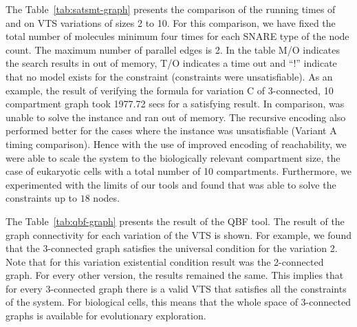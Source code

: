 

%
The Table~\ref{tab:satsmt-graph} presents the comparison of the running times of {\smttool} and {\sattool} on VTS variations of sizes 2 to 10.
%
For this comparison, we have fixed the total number of molecules minimum four times for each SNARE type of the node count. 
%
The maximum number of parallel edges is 2.
%
%
%
In the table M/O indicates the search results in out of memory, T/O indicates a time out and ``!'' indicate that no model exists for the constraint  (constraints were unsatisfiable).
%
As an example, the result of verifying the formula for variation C of 3-connected, 10 compartment graph took 1977.72 secs for a satisfying result.
%
In comparison, {\sattool} was unable to solve the instance and ran out of memory.
%
The recursive encoding also performed better for the cases where the instance was unsatisfiable (Variant A timing comparison).
%
Hence with the use of improved encoding of reachability, we were able to scale the system to the biologically relevant compartment size, the case of eukaryotic cells with a total number of 10 compartments.
%
Furthermore, we experimented with the limits of our tools and found that {\smttool} was able to solve the constraints up to $18$ nodes.



The Table~\ref{tab:qbf-graph} presents the result of the QBF tool.
%
The result of the graph connectivity for each variation of the VTS is shown.  
%
For example, we found that the 3-connected graph satisfies the universal condition for the variation 2. 
%
Note that for this variation existential condition result was the 2-connected graph. 
%
For every other version, the results remained the same.
%
This implies that for every 3-connected graph there is a valid VTS that satisfies all the constraints of the system.
% 
For biological cells, this means that the whole space of 3-connected graphs is available for evolutionary exploration.
%


